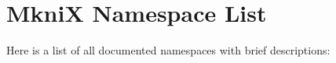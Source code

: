 \section{MkniX Namespace List}
Here is a list of all documented namespaces with brief descriptions:\begin{CompactList}
\item{}
\end{CompactList}
